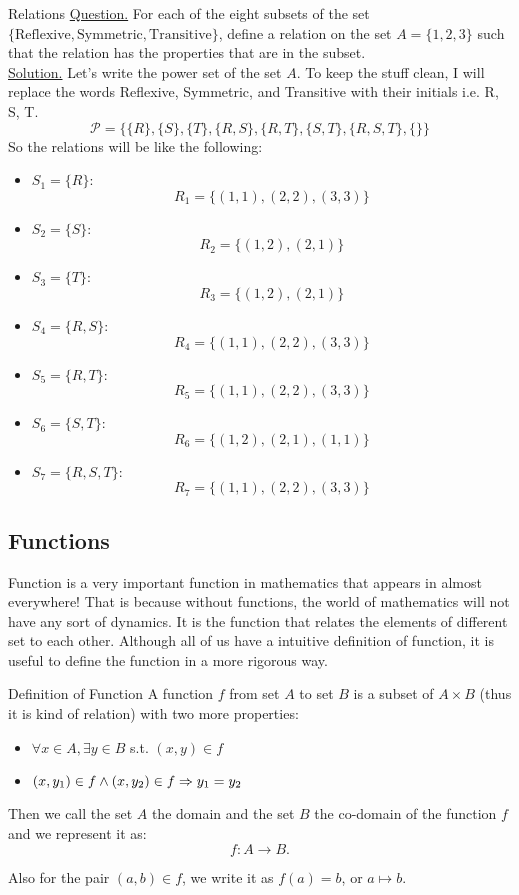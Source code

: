\begin{example}{Relations}
	\underline{Question.} For each of the eight subsets of the set $ \{ \text{Reflexive}, \text{Symmetric}, \text{Transitive} \} $, define a relation on the set $ A = \{ 1,2,3\} $ such that the relation has the properties that are in the subset. \\
	
	\underline{Solution.} Let's write the power set of the set $ A $. To keep the stuff clean, I will replace the words Reflexive, Symmetric, and Transitive with their initials i.e. R, S, T.
	\[ \mathcal{P} = \{ \{ R \}, \{ S \}, \{ T \}, \{ R,S \}, \{ R,T \}, \{ S,T \}, \{ R,S,T \}, \{  \} \} \]
	So the relations will be like the following:
	\begin{itemize}
		\item $ S_1 = \{ R \} $: \[ R_1 = \{ (1,1), (2,2), (3,3) \} \]
		\item $ S_2 = \{ S \} $: \[ R_2 = \{ (1,2), (2,1) \} \]
		\item $ S_3 = \{ T \} $: \[ R_3 = \{ (1,2), (2,1) \} \]
		\item $ S_4 = \{ R,S \} $: \[ R_4 = \{ (1,1), (2,2), (3,3) \} \]
		\item $ S_5 = \{ R,T \} $: \[ R_5 = \{ (1,1), (2,2), (3,3) \} \]
		\item $ S_6 = \{ S,T \} $: \[ R_6 = \{ (1,2), (2,1), (1,1) \} \]
		\item $ S_7 = \{ R,S,T \} $: \[ R_7 = \{ (1,1), (2,2), (3,3) \} \]
	\end{itemize}
\end{example}



\subsection{Functions}

Function is a very important function in mathematics that appears in almost everywhere! That is because without functions, the world of mathematics will not have any sort of dynamics. It is the function that relates the elements of different set to each other. Although all of us have a intuitive definition of function, it is useful to define the function in a more rigorous way.

\begin{defbox}{Definition of Function}
	A function $f$ from set $A$ to set $B$ is a subset of $A \times B$ (thus it is kind of relation) with two more properties:
	\begin{itemize}
		\item $\forall x \in A,  \exists y \in B$ s.t. $(x,y) \in f$
		\item $(x, y_1) \in f \wedge (x, y_2) \in f \Rightarrow y_1 = y_2$
	\end{itemize}
	
	Then we call the set $A$ the domain and the set $B$ the co-domain of the function $f$ and we represent it as:
	\[ f: A \rightarrow B. \]
	
	Also for the pair $(a,b) \in f$, we write it as $f(a) = b$, or $a \mapsto b$.
\end{defbox}

